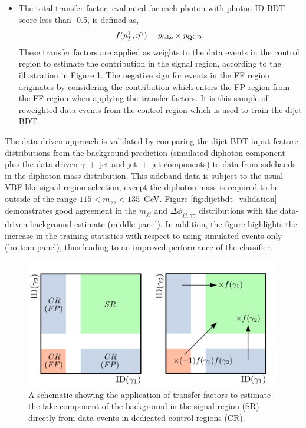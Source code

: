 \begin{itemize}
    \item The total transfer factor, evaluated for each photon with photon ID BDT score less than -0.5, is defined as,
    \begin{equation}
        f(p_T^\gamma,\eta^\gamma) = p_{\rm{fake}} \times p_{\rm{QCD}}.
    \end{equation}
    These transfer factors are applied as weights to the data events in the control region to estimate the contribution in the signal region, according to the illustration in Figure \ref{fig:dijetbdt_transferfunctions}. The negative sign for events in the FF region originates by considering the contribution which enters the FP region from the FF region when applying the transfer factors. It is this sample of reweighted data events from the control region which is used to train the dijet BDT.
\end{itemize}

The data-driven approach is validated by comparing the dijet BDT input feature distributions from the background prediction (simulated diphoton component plus the data-driven $\gamma$~+~jet and jet~+~jet components) to data from sidebands in the diphoton mass distribution. This sideband data is subject to the usual VBF-like signal region selection, except the diphoton mass is required to be outside of the range $115<m_{\gamma\gamma}<135$~GeV. Figure \ref{fig:dijetbdt_validation} demonstrates good agreement in the $m_{jj}$ and $\Delta\phi_{jj,\gamma\gamma}$ distributions with the data-driven background estimate (middle panel). In addition, the figure highlights the increase in the training statistics with respect to using simulated events only (bottom panel), thus leading to an improved performance of the classifier. 

\begin{figure}[htb!]
  \centering
  \includegraphics[width=.8\textwidth]{Figures/hgg_overview/dijetbdt_illustration.pdf}
  \caption[Illustration of the data-driven background estimate method for the dijet BDT]
  {
    A schematic showing the application of transfer factors to estimate the fake component of the background in the signal region (SR) directly from data events in dedicated control regions (CR).
  }
  \label{fig:dijetbdt_transferfunctions}
\end{figure}

